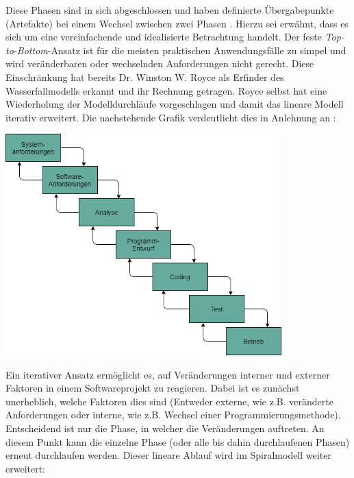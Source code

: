 Diese Phasen sind in sich abgeschlossen und haben definierte Übergabepunkte (Artefakte) bei einem Wechsel zwischen zwei Phasen \cite[S. 155]{Ludwig_Lichter_2013}. Hierzu sei erwähnt, dass es sich um eine vereinfachende und idealisierte Betrachtung handelt. Der feste \textit{Top-to-Bottom}-Ansatz ist für die meisten praktischen Anwendungsfälle zu simpel und wird veränderbaren oder wechselnden Anforderungen nicht gerecht. Diese Einschränkung hat bereits  Dr. Winston W. Royce als Erfinder des Wasserfallmodells \cite{royce1987managing} erkannt und ihr Rechnung getragen. Royce selbst hat eine Wiederholung der Modelldurchläufe vorgeschlagen \cite{Larmann_Basili_2003} und damit das lineare Modell iterativ erweitert. Die nachstehende Grafik verdeutlicht dies in Anlehnung an \cite[Abb. 3]{royce1987managing}:

\begin{center}
    \includegraphics[width=0.8\textwidth]{Grafiken/IterativesWasserfallmodell.png}
    \label{Grafik:Iteratives Wasserfallmodell nach Royce}
\end{center}

Ein iterativer Ansatz ermöglicht es, auf Veränderungen interner und externer Faktoren in einem Softwareprojekt zu reagieren. Dabei ist es zunächst unerheblich, welche Faktoren dies sind (Entweder externe, wie z.B. veränderte Anforderungen oder interne, wie z.B. Wechsel einer Programmierungsmethode). Entscheidend ist nur die Phase, in welcher die Veränderungen auftreten. An diesem Punkt kann die einzelne Phase (oder alle bis dahin durchlaufenen Phasen) erneut durchlaufen werden. Dieser lineare Ablauf wird im Spiralmodell weiter erweitert:

